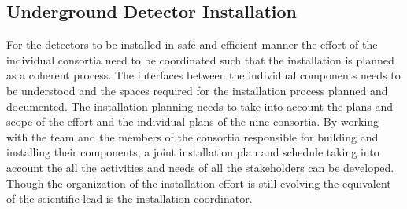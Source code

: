 
 







%

\subsection{Underground Detector Installation}
\label{sec:fdsp-coord-undergd}

For the  detectors to be installed in safe and efficient
manner the effort of the individual consortia need to be coordinated
such that the installation is planned as a coherent process. The
interfaces between the individual components needs to be understood
and the spaces required for the installation process planned and
documented. The installation planning needs to take into account the
plans and scope of the  effort and the individual plans of
the nine consortia. By working with the  team and the
members of the consortia responsible for building and installing their
components, a joint installation plan and schedule taking into account
the all the activities and needs of all the stakeholders can be
developed. Though the organization of the installation effort is still
evolving the equivalent of the scientific lead is the installation
coordinator.

